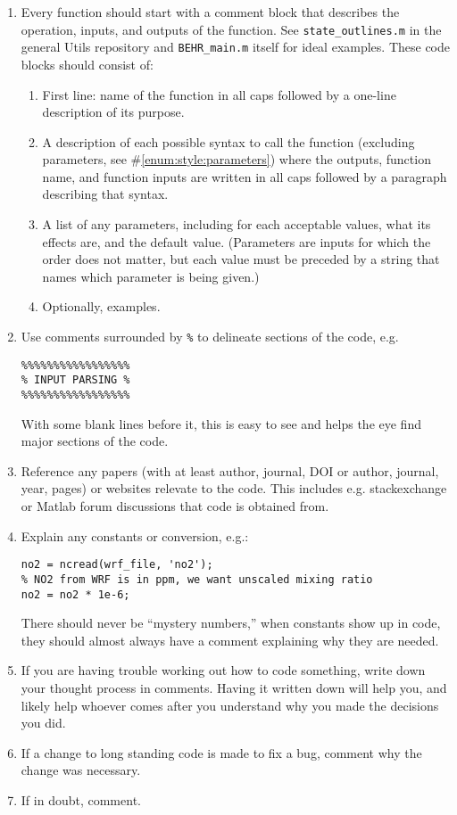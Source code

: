 \documentclass[12pt]{article}
\begin{document}
	\begin{enumerate}
	\item Every function should start with a comment block that describes the operation, inputs, and outputs of the function. See \lstinline$state_outlines.m$ in the general Utils repository and \lstinline$BEHR_main.m$ itself for ideal examples. These code blocks should consist of:
		\begin{enumerate}
		\item First line: name of the function in all caps followed by a one-line description of its purpose.
		\item A description of each possible syntax to call the function (excluding parameters, see \#\ref{enum:style:parameters}) where the outputs, function name, and function inputs are written in all caps followed by a paragraph describing that syntax.
		\item A list of any parameters, including for each acceptable values, what its effects are, and the default value. (Parameters are inputs for which the order does not matter, but each value must be preceded by a string that names which parameter is being given.) \label{enum:style:parameters}
		\item Optionally, examples.
		\end{enumerate}
		
	\item Use comments surrounded by \lstinline$%$ to delineate sections of the code, e.g.
	\begin{lstlisting}
%%%%%%%%%%%%%%%%%
% INPUT PARSING %
%%%%%%%%%%%%%%%%%
	\end{lstlisting}
	With some blank lines before it, this is easy to see and helps the eye find major sections of the code.
	
	\item Reference any papers (with at least author, journal, DOI or author, journal, year, pages) or websites relevate to the code. This includes e.g. stackexchange or Matlab forum discussions that code is obtained from.
	
	\item Explain any constants or conversion, e.g.:
\begin{lstlisting}
no2 = ncread(wrf_file, 'no2');
% NO2 from WRF is in ppm, we want unscaled mixing ratio
no2 = no2 * 1e-6;
\end{lstlisting}
	There should never be ``mystery numbers,'' when constants show up in code, they should almost always have a comment explaining why they are needed.
	
	\item If you are having trouble working out how to code something, write down your thought process in comments. Having it written down will help you, and likely help whoever comes after you understand why you made the decisions you did.
	
	\item If a change to long standing code is made to fix a bug, comment why the change was necessary.
	
	\item If in doubt, comment.
	\end{enumerate}
	
\end{document}
